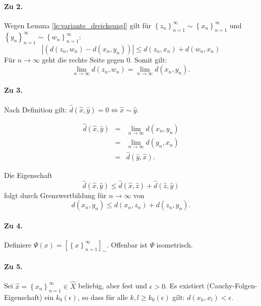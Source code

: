 \documentclass[10pt]{scrbook}
\begin{document}
\begin{bew}
\paragraph{Zu 2.} Wegen Lemma \ref{le:variante_dreicksungl} gilt für $\left\{z_n\right\}_{n=1}^\infty\sim\left\{x_n\right\}_{n=1}^\infty$ und $\left\{y_n\right\}_{n=1}^\infty\sim\left\{w_n\right\}_{n=1}^\infty$:
\begin{displaymath}
	\left|(d(z_n, w_n)-d(x_n, y_n))\right| \leq d(z_n, x_n)+d(w_n, x_n)
\end{displaymath}
Für $n\rightarrow \infty$ geht die rechte Seite gegen 0. Somit gilt:
\begin{displaymath}
	\lim_{n\rightarrow \infty} d(z_n, w_n)=\lim_{n\rightarrow \infty} d(x_n, y_n).
\end{displaymath}

\paragraph{Zu 3.} Nach Definition gilt: $\widehat{d}(\widehat{x}, \widehat{y})=0 \Leftrightarrow \widehat{x}\sim \widehat{y}$.

\begin{eqnarray*}
	\widehat{d}(\widehat{x}, \widehat{y}) & = & \lim_{n\rightarrow \infty} d(x_n, y_n) \\
	& = & \lim_{n\rightarrow \infty} d(y_n, x_n) \\
	& = & \widehat{d}(\widehat{y}, \widehat{x}).
\end{eqnarray*}

Die Eigenschaft
\begin{displaymath}
	\widehat{d}(\widehat{x}, \widehat{y}) \leq \widehat{d}(\widehat{x}, \widehat{z})+\widehat{d}(\widehat{z}, \widehat{y})
\end{displaymath}
folgt durch Grenzwertbildung für $n\rightarrow\infty$ von
\begin{displaymath}
	d(x_n, y_n) \leq d(x_n, z_n)+d(z_n, y_n).
\end{displaymath}

\paragraph{Zu 4.}
Definiere $\Psi(x)=\left[\left\{x\right\}_{n=1}^\infty\right]_\sim$. Offenbar ist $\Psi$ isometrisch.

\paragraph{Zu 5.} Sei $\widehat{x}=\left\{x_n\right\}_{n=1}^\infty\in\widehat{X}$ beliebig, aber fest und $\epsilon>0$. Es existiert (Cauchy-Folgen-Eigenschaft) ein $k_0(\epsilon)$, so dass für alle $k, l\geq k_0(\epsilon)$ gilt: $d(x_k, x_l)<\epsilon$.


\end{bew}
\end{document}

